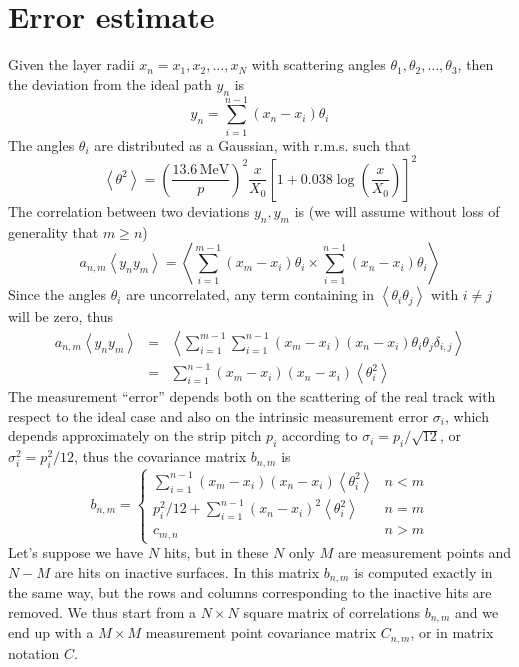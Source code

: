 \documentclass[10pt,a4paper]{article}
\begin{document}
\section{Error estimate}
Given the layer radii $x_n = x_1, x_2, \ldots, x_N$ with scattering angles $\theta_1, \theta_2, \ldots, \theta_3$, then
the deviation from the ideal path $y_n$ is
\begin{equation}
y_n=\sum_{i=1}^{n-1} \left (  x_n - x_i \right ) \theta_i
\end{equation}
The angles $\theta_i$ are distributed as a Gaussian, with r.m.s. such that
\begin{equation}
\left < \theta^2 \right > =
    \left ( \frac {13.6\,\mathrm{MeV}} {p} \right )^2
    \frac x {X_0}
    \left [ 1+ 0.038 \log \left ( \frac x {X_0} \right ) \right ] ^2
\end{equation}
The correlation between two deviations $y_n, y_m$ is (we will assume without loss of generality that $m \geq n$)
\begin{equation}
a_{n,m}\left < y_n y_m \right > =
      \left <
      \sum_{i=1}^{m-1} \left (  x_m - x_i \right ) \theta_i
      \times
      \sum_{i=1}^{n-1} \left (  x_n - x_i \right ) \theta_i
      \right >
\end{equation}
Since the angles $\theta_i$ are uncorrelated, any term containing in $\left < \theta_i \theta_j \right >$ with $i\neq j$ will be zero, thus
\begin{eqnarray}
a_{n,m}\left < y_n y_m \right > & = &
      \left <
      \sum_{i=1}^{m-1} \sum_{i=1}^{n-1}
      \left (  x_m - x_i \right )
      \left (  x_n - x_i \right ) \theta_i \theta_j \delta_{i,j}
      \right > \nonumber \\
      & = &
      \sum_{i=1}^{n-1} 
      \left (  x_m - x_i \right )
      \left (  x_n - x_i \right )  \left < \theta_i^2 \right > 
\end{eqnarray}
The measurement ``error'' depends both on the scattering of the real track with respect to the ideal case
and also on the intrinsic measurement error $\sigma_i$, which depends approximately on the strip pitch $p_i$
according to $\sigma_i = p_i / \sqrt{12}$, or $\sigma_i^2 = p_i^2 / 12$, thus the covariance matrix $b_{n,m}$ is
\begin{equation}
b_{n,m}= \left \{
\begin{array}{cl}
 \sum_{i=1}^{n-1} \left (  x_m - x_i \right ) \left (  x_n - x_i \right )  \left < \theta_i^2 \right > & n<m \\
 p_i^2 / 12 + \sum_{i=1}^{n-1} \left (  x_n - x_i \right )^2  \left < \theta_i^2 \right > & n=m \\
 c_{m,n}  & n>m
\end{array}
\right .
\end{equation}
Let's suppose we have $N$ hits, but in these $N$ only $M$ are measurement points and $N-M$ are hits
on inactive surfaces. In this matrix $b_{n,m}$ is computed exactly in the same way, but the rows
and columns corresponding to the inactive hits are removed. We thus start from a $N\times N$ square matrix
of correlations $b_{n,m}$ and we end up with a $M\times M$ measurement point covariance matrix $C_{n,m}$,
or in matrix notation $C$.


\label{LastPage}
\end{document}
